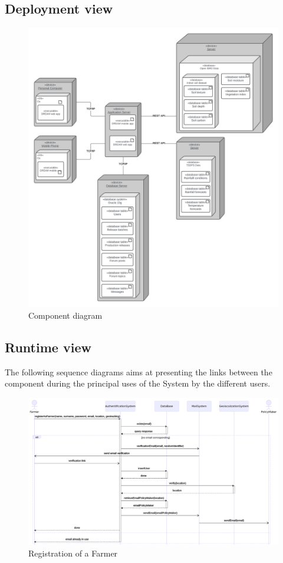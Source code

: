 \subsection{Deployment view}
\begin{figure} [!h]
	\centering
	\includegraphics[width=\textwidth]{Images/deployment-view.png}
	\caption{\label{fig:component_diag} Component diagram}
\end{figure}

\subsection{Runtime view}
The following sequence diagrams aims at presenting the links between the component during the principal uses of the System by the different users.

\begin{figure} [!h]
	\centering
	\includegraphics[width=\textwidth]{Images/seq_registration.png}
	\caption{\label{fig:seq_registration} Registration of a Farmer}
\end{figure}

